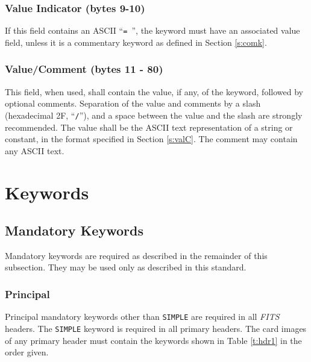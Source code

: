    \subsubsection{Value Indicator (bytes 9-10)}
   If this field contains an ASCII ``\verb*+= +'', the keyword 
   must have an associated value field, unless it is a commentary
   keyword as defined in 
   Section \ref{s:comk}.

   \subsubsection{Value/Comment (bytes 11 - 80)}
   This field, when used, shall contain the value, if any, of
   the keyword, followed by optional comments.  Separation of
   the value and comments by a
   slash (hexadecimal 2F, ``{\tt /}''), and a 
   space between the value and the slash
   are strongly recommended. The
   value shall be the ASCII text representation of a string or
   constant, in the format specified in Section \ref{s:valC}.  
   The comment may contain any ASCII text. 
             
  \section{Keywords}
   \label{s:key}
                                   
   \subsection{Mandatory Keywords}
   Mandatory keywords are required as 
   described in the remainder of this subsection. They may be used only as
   described in this standard. \label{s:man}
  
   \subsubsection{Principal}
   Principal mandatory keywords other than {\tt SIMPLE} 
   are
   required in all {\em FITS\/} headers. The {\tt SIMPLE} keyword is
   required in all primary headers. 
   The card images of any primary header must contain the keywords 
   shown in Table \ref{t:hdr1} in the 
   order
   given. \label{s:pman}
                                                

